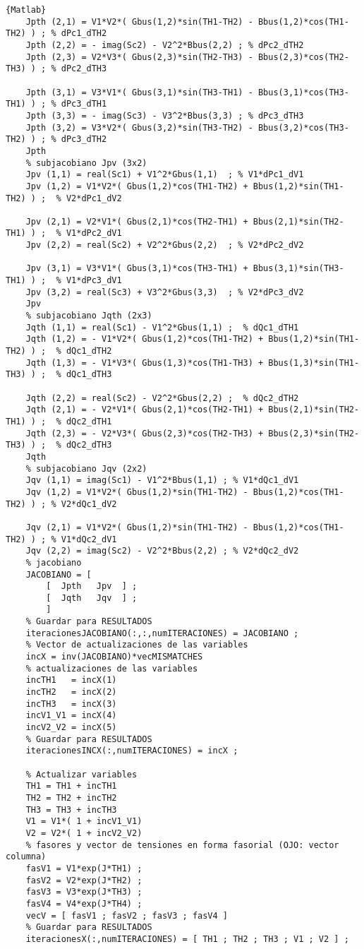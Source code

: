 \documentclass[a4paper,10pt,titlepage,oneside]{article}
\begin{document}
{\begin{lstlisting}[frame=lines]{Matlab}
    Jpth (2,1) = V1*V2*( Gbus(1,2)*sin(TH1-TH2) - Bbus(1,2)*cos(TH1-TH2) ) ; % dPc1_dTH2
    Jpth (2,2) = - imag(Sc2) - V2^2*Bbus(2,2) ; % dPc2_dTH2
	Jpth (2,3) = V2*V3*( Gbus(2,3)*sin(TH2-TH3) - Bbus(2,3)*cos(TH2-TH3) ) ; % dPc2_dTH3

    Jpth (3,1) = V3*V1*( Gbus(3,1)*sin(TH3-TH1) - Bbus(3,1)*cos(TH3-TH1) ) ; % dPc3_dTH1
    Jpth (3,3) = - imag(Sc3) - V3^2*Bbus(3,3) ; % dPc3_dTH3
	Jpth (3,2) = V3*V2*( Gbus(3,2)*sin(TH3-TH2) - Bbus(3,2)*cos(TH3-TH2) ) ; % dPc3_dTH2
	Jpth
    % subjacobiano Jpv (3x2)
	Jpv (1,1) = real(Sc1) + V1^2*Gbus(1,1)  ; % V1*dPc1_dV1
    Jpv (1,2) = V1*V2*( Gbus(1,2)*cos(TH1-TH2) + Bbus(1,2)*sin(TH1-TH2) ) ;  % V2*dPc1_dV2
	
    Jpv (2,1) = V2*V1*( Gbus(2,1)*cos(TH2-TH1) + Bbus(2,1)*sin(TH2-TH1) ) ;  % V1*dPc2_dV1
    Jpv (2,2) = real(Sc2) + V2^2*Gbus(2,2)  ; % V2*dPc2_dV2
    
    Jpv (3,1) = V3*V1*( Gbus(3,1)*cos(TH3-TH1) + Bbus(3,1)*sin(TH3-TH1) ) ;  % V1*dPc3_dV1
    Jpv (3,2) = real(Sc3) + V3^2*Gbus(3,3)  ; % V2*dPc3_dV2
    Jpv
	% subjacobiano Jqth (2x3)
	Jqth (1,1) = real(Sc1) - V1^2*Gbus(1,1) ;  % dQc1_dTH1
    Jqth (1,2) = - V1*V2*( Gbus(1,2)*cos(TH1-TH2) + Bbus(1,2)*sin(TH1-TH2) ) ;  % dQc1_dTH2
	Jqth (1,3) = - V1*V3*( Gbus(1,3)*cos(TH1-TH3) + Bbus(1,3)*sin(TH1-TH3) ) ;  % dQc1_dTH3
	
    Jqth (2,2) = real(Sc2) - V2^2*Gbus(2,2) ;  % dQc2_dTH2
    Jqth (2,1) = - V2*V1*( Gbus(2,1)*cos(TH2-TH1) + Bbus(2,1)*sin(TH2-TH1) ) ;  % dQc2_dTH1
	Jqth (2,3) = - V2*V3*( Gbus(2,3)*cos(TH2-TH3) + Bbus(2,3)*sin(TH2-TH3) ) ;  % dQc2_dTH3
    Jqth
	% subjacobiano Jqv (2x2)
	Jqv (1,1) = imag(Sc1) - V1^2*Bbus(1,1) ; % V1*dQc1_dV1
	Jqv (1,2) = V1*V2*( Gbus(1,2)*sin(TH1-TH2) - Bbus(1,2)*cos(TH1-TH2) ) ; % V2*dQc1_dV2
    
    Jqv (2,1) = V1*V2*( Gbus(1,2)*sin(TH1-TH2) - Bbus(1,2)*cos(TH1-TH2) ) ; % V1*dQc2_dV1
	Jqv (2,2) = imag(Sc2) - V2^2*Bbus(2,2) ; % V2*dQc2_dV2
    % jacobiano
	JACOBIANO = [ 
		[  Jpth   Jpv  ] ;
		[  Jqth   Jqv  ] ;
		]
	% Guardar para RESULTADOS
	iteracionesJACOBIANO(:,:,numITERACIONES) = JACOBIANO ;
	% Vector de actualizaciones de las variables
	incX = inv(JACOBIANO)*vecMISMATCHES
	% actualizaciones de las variables
	incTH1   = incX(1)
    incTH2   = incX(2)
	incTH3   = incX(3)
	incV1_V1 = incX(4)
    incV2_V2 = incX(5)
	% Guardar para RESULTADOS
	iteracionesINCX(:,numITERACIONES) = incX ;

	% Actualizar variables
    TH1 = TH1 + incTH1
	TH2 = TH2 + incTH2
	TH3 = TH3 + incTH3
	V1 = V1*( 1 + incV1_V1)
    V2 = V2*( 1 + incV2_V2)
	% fasores y vector de tensiones en forma fasorial (OJO: vector columna)
	fasV1 = V1*exp(J*TH1) ;
    fasV2 = V2*exp(J*TH2) ;
	fasV3 = V3*exp(J*TH3) ;
    fasV4 = V4*exp(J*TH4) ;
	vecV = [ fasV1 ; fasV2 ; fasV3 ; fasV4 ]
	% Guardar para RESULTADOS
	iteracionesX(:,numITERACIONES) = [ TH1 ; TH2 ; TH3 ; V1 ; V2 ] ;


\end{lstlisting}}
\end{document}
